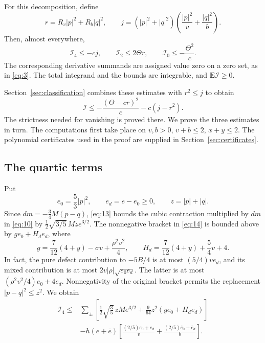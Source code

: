 \begin{samepage}
\begin{proposition}
\label{prop:coupling-estimates}
For this decomposition, define
\[
 r=R_v|p|^2+R_b|q|^2,\qquad
 j=(|p|^2+|q|^2)
       \left(\frac{|p|^2}{v}+\frac{|q|^2}{b}\right).
\]
Then, almost everywhere,
\[
 \mathcal I_4\le-cj,\qquad
 \mathcal I_2\le2\Theta r,\qquad
 \mathcal I_0\le-\frac{\Theta^2}{c}.
\]
The corresponding derivative summands are assigned value zero on a
zero set, as in \eqref{eq:3}. The total integrand and the bounds are
integrable, and $\mathbf E\mathcal I\ge0$.
\end{proposition}
\end{samepage}

Section~\ref{sec:classification} combines these estimates with $r^2\le j$ to obtain
\[
 \mathcal I\le-\frac{(\Theta-cr)^2}{c}-c(j-r^2).
\]
The strictness needed for vanishing is proved there.
We prove the three estimates in turn. The computations first take place
on $v,b>0$, $v+b\le2$, $x+y\le2$. The polynomial certificates used in
the proof are supplied in Section~\ref{sec:certificates}.

\subsection{The quartic terms}

Put
\[
 e_0=\frac53|p|^2,\qquad e_d=e-e_0\ge0,\qquad z=|p|+|q|.
\]
Since $dm=-\frac34M(p-q)$, \eqref{eq:13} bounds the cubic contraction
multiplied by $dm$ in \eqref{eq:10} by
$\frac12\sqrt{3/5}\,Mz e^{3/2}$. The nonnegative bracket in
\eqref{eq:14} is bounded above by $g e_0+H_d e_d$, where
\[
 g=\frac7{12}(4+y)-\sigma v+\frac{\rho^2v^2}{4},\qquad
 H_d=\frac7{12}(4+y)+\frac54v+4.
\]
In fact, the pure defect contribution to $-5B/4$ is at most
$(5/4)v e_d$, and its mixed contribution is at most
$2v|\rho|\sqrt{e_0e_d}$. The latter is at most
$(\rho^2v^2/4)e_0+4e_d$. Nonnegativity of the original bracket permits
the replacement $|p-q|^2\le z^2$. We obtain
\begin{equation}
\begin{aligned}
 \mathcal I_4\le{}&
 \sum_\pm\left[
       \frac12\sqrt{\frac35}\,zMe^{3/2}
       +\frac9{64}z^2(g e_0+H_de_d)\right]\\
 &-h(e+\bar e)
       \left[\frac{(2/5)e_0+e_d}{v}
             +\frac{(2/5)\bar e_0+\bar e_d}{b}\right].
\end{aligned}
\tag{19}\label{eq:19}
\end{equation}

